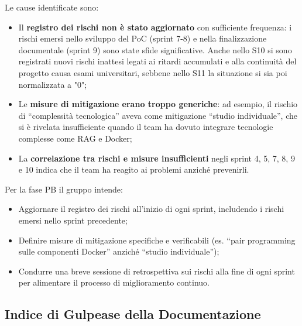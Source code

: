 \documentclass[a4paper,11pt,oneside]{scrartcl}
\begin{document}
Le cause identificate sono:
\begin{itemize}
    \item Il \textbf{registro dei rischi non è stato aggiornato} con sufficiente frequenza: i rischi emersi nello sviluppo del PoC (sprint 7-8) e nella finalizzazione documentale (sprint 9) sono state sfide significative. Anche nello S10 si sono registrati nuovi rischi inattesi legati ai ritardi accumulati e alla continuità del progetto causa esami universitari, sebbene nello S11 la situazione si sia poi normalizzata a "0";
    \item Le \textbf{misure di mitigazione erano troppo generiche}: ad esempio, il rischio di ``complessità tecnologica'' aveva come mitigazione ``studio individuale'', che si è rivelata insufficiente quando il team ha dovuto integrare tecnologie complesse come RAG e Docker;
    \item La \textbf{correlazione tra rischi e misure insufficienti} negli sprint 4, 5, 7, 8, 9 e 10 indica che il team ha reagito ai problemi anziché prevenirli.
\end{itemize}

Per la fase PB il gruppo intende:
\begin{itemize}
    \item Aggiornare il registro dei rischi all'inizio di ogni sprint, includendo i rischi emersi nello sprint precedente;
    \item Definire misure di mitigazione specifiche e verificabili (es. ``pair programming sulle componenti Docker'' anziché ``studio individuale'');
    \item Condurre una breve sessione di retrospettiva sui rischi alla fine di ogni sprint per alimentare il processo di miglioramento continuo.
\end{itemize}

\subsection{Indice di Gulpease della Documentazione}
\end{document}
